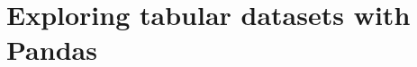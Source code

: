 \documentclass[aspectratio=169,usenames,dvipsnames]{beamer}
\begin{document}
\section{Exploring tabular datasets with Pandas}
\frame{\tableofcontents[currentsection]}










\end{document}
